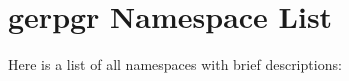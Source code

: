\section{gerpgr Namespace List}
Here is a list of all namespaces with brief descriptions:\begin{CompactList}
\item{}
\item{}
\end{CompactList}
